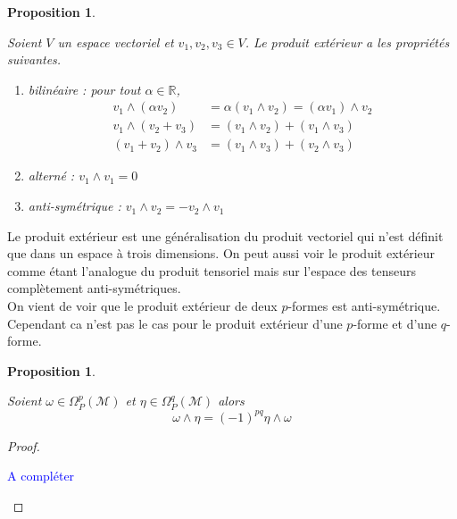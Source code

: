 \documentclass[a4paper,11pt]{report}
\theoremstyle{definition}
\theoremstyle{plain}
\newtheorem{prop}[thm]{Proposition}
\theoremstyle{definition}
\theoremstyle{remark}
\newcommand{\comp}{\begin{center}\textcolor{blue}{A compléter}\end{center}}
\newcommand{\M}{\mathscr{M}}
\begin{document}
            \begin{prop}\begin{leftbar}
                Soient $V$ un espace vectoriel et $v_1,v_2,v_3\in V$. Le produit extérieur a les propriétés suivantes.
                \begin{enumerate}[label = \textit{\roman*)}]
                    \item bilinéaire : pour tout $\alpha\in\mathbb{R}$,
                    \begin{align}
                        v_1\wedge (\alpha v_2) &= \alpha(v_1\wedge v_2) = (\alpha v_1)\wedge v_2\\
                        v_1\wedge(v_2+v_3) &= (v_1\wedge v_2) + (v_1\wedge v_3)\\
                        (v_1+v_2)\wedge v_3 &= (v_1\wedge v_3) + (v_2\wedge v_3)
                    \end{align}
                    \item alterné : $v_1 \wedge v_1 = 0$
                    \item anti-symétrique : $v_1\wedge v_2 = -v_2\wedge v_1$
                \end{enumerate}
            \end{leftbar}\end{prop}
            
            Le produit extérieur est une généralisation du produit vectoriel qui n'est définit que dans un espace à trois dimensions. On peut aussi voir le produit extérieur comme étant l'analogue du produit tensoriel mais sur l'espace des tenseurs complètement anti-symétriques.\\
            
            On vient de voir que le produit extérieur de deux $p$-formes est anti-symétrique. Cependant ca n'est pas le cas pour le produit extérieur d'une $p$-forme et d'une $q$-forme.
            
            \begin{prop}\begin{leftbar}
                Soient $\omega\in\Omega_P^p(\M)$ et $\eta\in \Omega_P^q(\M)$ alors
                \begin{equation}
                    \omega\wedge\eta = (-1)^{pq}\eta\wedge\omega
                \end{equation}
            \end{leftbar}\end{prop}
            
            \begin{proof}${}$\\
                \comp
            \end{proof}
            
\end{document}
